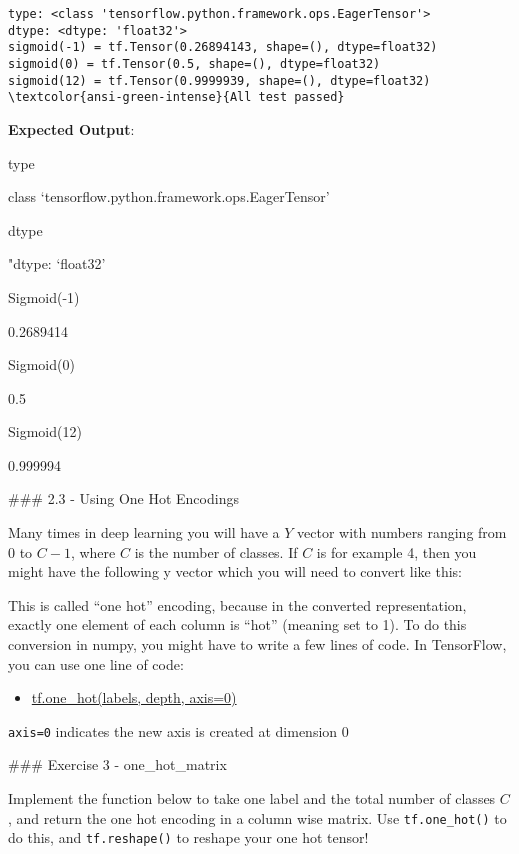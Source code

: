 \documentclass[11pt]{article}
\providecommand{\tightlist}{%
      \setlength{\itemsep}{0pt}\setlength{\parskip}{0pt}}
\begin{document}
    \begin{Verbatim}[commandchars=\\\{\}]
type: <class 'tensorflow.python.framework.ops.EagerTensor'>
dtype: <dtype: 'float32'>
sigmoid(-1) = tf.Tensor(0.26894143, shape=(), dtype=float32)
sigmoid(0) = tf.Tensor(0.5, shape=(), dtype=float32)
sigmoid(12) = tf.Tensor(0.9999939, shape=(), dtype=float32)
\textcolor{ansi-green-intense}{All test passed}
    \end{Verbatim}

    \textbf{Expected Output}:

type

class `tensorflow.python.framework.ops.EagerTensor'

dtype

"dtype: `float32'

Sigmoid(-1)

0.2689414

Sigmoid(0)

0.5

Sigmoid(12)

0.999994

    \#\#\# 2.3 - Using One Hot Encodings

Many times in deep learning you will have a \(Y\) vector with numbers
ranging from \(0\) to \(C-1\), where \(C\) is the number of classes. If
\(C\) is for example 4, then you might have the following y vector which
you will need to convert like this:

This is called ``one hot'' encoding, because in the converted
representation, exactly one element of each column is ``hot'' (meaning
set to 1). To do this conversion in numpy, you might have to write a few
lines of code. In TensorFlow, you can use one line of code:

\begin{itemize}
\tightlist
\item
  \href{https://www.tensorflow.org/api_docs/python/tf/one_hot}{tf.one\_hot(labels,
  depth, axis=0)}
\end{itemize}

\texttt{axis=0} indicates the new axis is created at dimension 0

\#\#\# Exercise 3 - one\_hot\_matrix

Implement the function below to take one label and the total number of
classes \(C\), and return the one hot encoding in a column wise matrix.
Use \texttt{tf.one\_hot()} to do this, and \texttt{tf.reshape()} to
reshape your one hot tensor!
\end{document}
